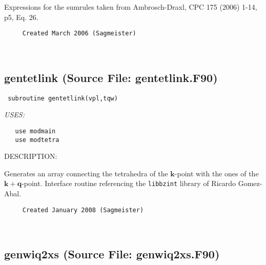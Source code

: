 \documentclass[11pt]{article}
\begin{document}
     Expressions for the sumrules taken from Ambrosch-Draxl,
     CPC 175 (2006) 1-14, p5, Eq. 26.
  
\begin{verbatim}     Created March 2006 (Sagmeister)\end{verbatim}




 
 
\mbox{}\hrulefill\ 
 
\subsection{gentetlink (Source File: gentetlink.F90)}


\begin{verbatim} subroutine gentetlink(vpl,tqw)\end{verbatim}{\em USES:}
\begin{verbatim}   use modmain
   use modtetra\end{verbatim}
{\sf DESCRIPTION:\\ }


     Generates an array connecting the tetrahedra of the $\mathbf{k}$-point with
     the ones of the  $\mathbf{k}+\mathbf{q}$-point. Interface routine
     referencing the {\tt libbzint} library of Ricardo Gomez-Abal.
  
\begin{verbatim}     Created January 2008 (Sagmeister)\end{verbatim}






 
 
\mbox{}\hrulefill\ 
 
\subsection{genwiq2xs (Source File: genwiq2xs.F90)}
\end{document}
